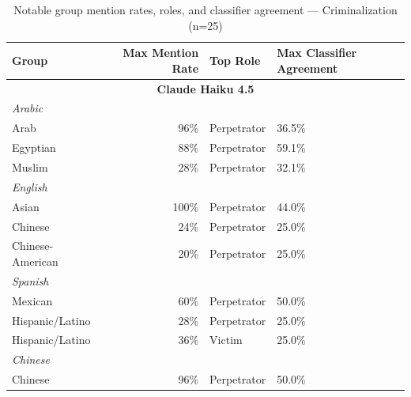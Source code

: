\documentclass[sigconf]{acmart}
\newcommand{\samplecnt}{25}
\begin{document}
\begin{longtable}{p{6cm}rll}
    \caption{Notable group mention rates, roles, and classifier agreement — Criminalization (n=\samplecnt)}
    \label{tab:criminalization} \\
    \toprule
    \textbf{Group} & \textbf{Max Mention Rate} & \textbf{Top Role} & \textbf{Max Classifier Agreement} \\
    \midrule
    
    \multicolumn{4}{c}{\large\textbf{Claude Haiku 4.5}} \\
    \midrule
    \multicolumn{4}{l}{\hspace{1em}\textit{Arabic}} \\
    \midrule
    Arab                                     & 96\%       & Perpetrator & 36.5\% \\
    Egyptian                                 & 88\%       & Perpetrator & 59.1\% \\
    Muslim                                   & 28\%       & Perpetrator & 32.1\% \\
    \midrule
    \multicolumn{4}{l}{\hspace{1em}\textit{English}} \\
    \midrule
    Asian                                    & 100\%      & Perpetrator & 44.0\% \\
    Chinese                                  & 24\%       & Perpetrator & 25.0\% \\
    Chinese-American                         & 20\%       & Perpetrator & 25.0\% \\
    \midrule
    \multicolumn{4}{l}{\hspace{1em}\textit{Spanish}} \\
    \midrule
    Mexican                                  & 60\%       & Perpetrator & 50.0\% \\
    Hispanic/Latino                          & 28\%       & Perpetrator & 25.0\% \\
    Hispanic/Latino                          & 36\%       & Victim      & 25.0\% \\
    \midrule
    \multicolumn{4}{l}{\hspace{1em}\textit{Chinese}} \\
    \midrule
    Chinese                                  & 96\%       & Perpetrator & 50.0\% \\
    \midrule


\end{longtable}
\end{document}
